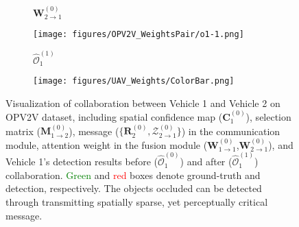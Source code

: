 \documentclass{article}
\begin{document}
\begin{figure}[!t]
\begin{subfigure}{0.22\linewidth}
    \caption{$\mathbf{W}_{2\rightarrow 1}^{(0)}$}
    \label{fig:UAV_AttenWeight2to1}
  \end{subfigure}
  \begin{subfigure}{0.22\linewidth}
    \texttt{[image: figures/OPV2V\_WeightsPair/o1-1.png]}
    \vspace{-5mm}
    \caption{$\widehat{\mathcal{O}}_{1}^{(1)}$}
    \label{fig:UAV_Detections}
  \end{subfigure}
  \begin{subfigure}{0.07\linewidth}
    \texttt{[image: figures/UAV\_Weights/ColorBar.png]}
    \end{subfigure}
\vspace{-2mm}
  \caption{Visualization of collaboration between Vehicle 1 and Vehicle 2 on OPV2V dataset, including spatial confidence map ($\mathbf{C}_1^{(0)}$), selection matrix ($\mathbf{M}_{1\rightarrow2}^{(0)}$), message ($\{\mathbf{R}_2^{(0)},\mathcal{Z}_{2\rightarrow1}^{(0)}\}$) in the communication module, attention weight in the fusion module ($\mathbf{W}_{1\rightarrow1}^{(0)}$,$\mathbf{W}_{2\rightarrow1}^{(0)}$), and Vehicle 1's detection results before ($\widehat{\mathcal{O}}_{1}^{(0)}$) and after ($\widehat{\mathcal{O}}_{1}^{(1)}$) collaboration. \textcolor{green}{Green} and \textcolor{red}{red} boxes denote ground-truth and detection, respectively. The objects occluded can be detected through transmitting spatially sparse, yet perceptually critical message. }
  \label{fig:OPV2V_Weights}
  \vspace{-4mm}
\end{figure}
\end{document}
